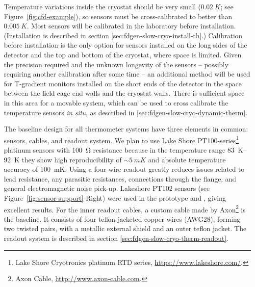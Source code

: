 
Temperature variations inside the cryostat should be very small ($\SI{0.02}{K}$; see Figure~\ref{fig:cfd-example}),
so sensors must be cross-calibrated to better than $\SI{0.005}{K}$. Most sensors will be calibrated in the laboratory before installation.
(Installation is described in section \ref{sec:fdgen-slow-cryo-install-th}.)
Calibration before installation is the only option for sensors installed on the long sides of the detector and the top and bottom of the cryostat, where space is limited.
Given the precision required and the unknown longevity of the sensors -- possibly requiring another  calibration after some time -- an additional method
will be used for T-gradient monitors installed on the short ends of the detector in the space between the field cage end walls and the cryostat walls. There is sufficient space in this area for a movable system, which can be used to cross calibrate
the temperature sensors {\em in situ}, as described in \ref{sec:fdgen-slow-cryo-dynamic-therm}.

The baseline design for all thermometer systems have three elements in
common: sensors, cables, and readout system. We plan to use Lake Shore
PT100-series\footnote{Lake Shore Cryotronics\texttrademark{} platinum RTD series,
  \url{https://www.lakeshore.com/}.} %
platinum sensors with \SI{100}{\ohm} resistance %
because in
the temperature range \SIrange{83}{92}{K} %
they 
show high reproducibility of $\sim\SI{5}{mK}$ and absolute temperature
accuracy of \SI{100}{mK}.  Using a four-wire readout greatly reduces
issues related to lead resistance, any parasitic resistances,
connections through the flange, and general electromagnetic noise
pick-up. Lakeshore PT102 sensors (see
Figure~\ref{fig:sensor-support}-Right) were used in the  prototype
and , %
giving excellent results. For the inner
readout cables, a custom cable made by Axon\footnote{Axon\texttrademark{} Cable, \url{http://www.axon-cable.com}.}
is the baseline. It
consists of four teflon-jacketed copper wires (AWG28), forming two
twisted pairs, with a metallic external shield and an outer teflon
jacket.
The readout system is described in section \ref{sec:fdgen-slow-cryo-therm-readout}.


